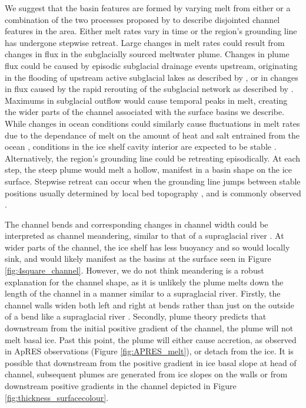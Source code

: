 We suggest that the basin features are formed by varying melt from either or a combination of the two processes proposed by \cite{horgan2017poststagnation} to describe disjointed channel features in the area. Either melt rates vary in time or the region's grounding line has undergone stepwise retreat.
Large changes in melt rates could result from changes in flux in the subglacially sourced meltwater plume. Changes in plume flux could be caused by episodic subglacial drainage events upstream, originating in the flooding of upstream active subglacial lakes as described by \cite{kim2016active}, or in changes in flux caused by the rapid rerouting of the subglacial network as described by \cite{carter2012supply}. Maximums in subglacial outflow would cause temporal peaks in melt, creating the wider parts of the channel associated with the surface basins we describe. 
While changes in ocean conditions could similarly cause fluctuations in melt rates due to the dependance of melt on the amount of heat and salt entrained from the ocean \citep{jenkins1991one}, conditions in the ice shelf cavity interior are expected to be stable \citep{stevens2020ocean}. 
Alternatively, the region's grounding line could be retreating episodically. At each step, the steep plume would melt a hollow, manifest in a basin shape on the ice surface.
 Stepwise retreat can occur when the grounding line jumps between stable positions usually determined by local bed topography \citep{haseloff2018effect}, and is commonly observed \cite [e.g.][] {jakobsson2012ice}.  
 

The channel bends and corresponding changes in channel width could be interpreted as channel meandering, similar to that of a supraglacial river \cite [e.g.][] {ferguson1973sinuosity}. 
At wider parts of the channel, the ice shelf has less buoyancy and so would locally sink, and would likely manifest as the basins at the surface seen in Figure \ref{fig:4square_channel}. However, we do not think meandering is a robust explanation for the channel shape, as it is unlikely the plume melts down the length of the channel in a manner similar to a supraglacial river. 
Firstly, the channel walls widen both left and right at bends rather than just on the outside of a bend like a supraglacial river \citep{ferguson1973sinuosity}.
Secondly, plume theory predicts that downstream from the initial positive gradient of the channel, the plume will not melt basal ice. Past this point, the plume will either cause accretion, as observed in ApRES observations (Figure \ref{fig:APRES_melt}), or detach from the ice.  It is possible that downstream from the positive gradient in ice basal slope at head of channel, subsequent plumes are generated from ice slopes on the walls or from downstream positive gradients in the channel depicted in Figure \ref{fig:thickness_surfacecolour}. 

